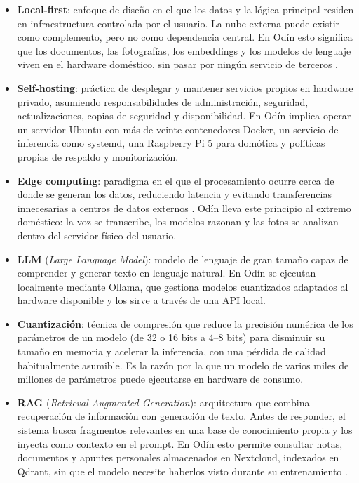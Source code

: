 \begin{itemize}

  \item \textbf{Local-first}: enfoque de diseño en el que los datos y la lógica principal residen en infraestructura controlada por el usuario. La nube externa puede existir como complemento, pero no como dependencia central. En Odín esto significa que los documentos, las fotografías, los embeddings y los modelos de lenguaje viven en el hardware doméstico, sin pasar por ningún servicio de terceros \cite{kleppmann2019localfirst}.

  \item \textbf{Self-hosting}: práctica de desplegar y mantener servicios propios en hardware privado, asumiendo responsabilidades de administración, seguridad, actualizaciones, copias de seguridad y disponibilidad. En Odín implica operar un servidor Ubuntu con más de veinte contenedores Docker, un servicio de inferencia como systemd, una Raspberry Pi 5 para domótica y políticas propias de respaldo y monitorización.

  \item \textbf{Edge computing}: paradigma en el que el procesamiento ocurre cerca de donde se generan los datos, reduciendo latencia y evitando transferencias innecesarias a centros de datos externos \cite{satyanarayanan2009cloudlets}. Odín lleva este principio al extremo doméstico: la voz se transcribe, los modelos razonan y las fotos se analizan dentro del servidor físico del usuario.

  \item \textbf{LLM} (\textit{Large Language Model}): modelo de lenguaje de gran tamaño capaz de comprender y generar texto en lenguaje natural. En Odín se ejecutan localmente mediante Ollama, que gestiona modelos cuantizados adaptados al hardware disponible y los sirve a través de una API local.

  \item \textbf{Cuantización}: técnica de compresión que reduce la precisión numérica de los parámetros de un modelo (de 32 o 16 bits a 4--8 bits) para disminuir su tamaño en memoria y acelerar la inferencia, con una pérdida de calidad habitualmente asumible. Es la razón por la que un modelo de varios miles de millones de parámetros puede ejecutarse en hardware de consumo.

  \item \textbf{RAG} (\textit{Retrieval-Augmented Generation}): arquitectura que combina recuperación de información con generación de texto. Antes de responder, el sistema busca fragmentos relevantes en una base de conocimiento propia y los inyecta como contexto en el prompt. En Odín esto permite consultar notas, documentos y apuntes personales almacenados en Nextcloud, indexados en Qdrant, sin que el modelo necesite haberlos visto durante su entrenamiento \cite{lewis2020rag}.


\end{itemize}
